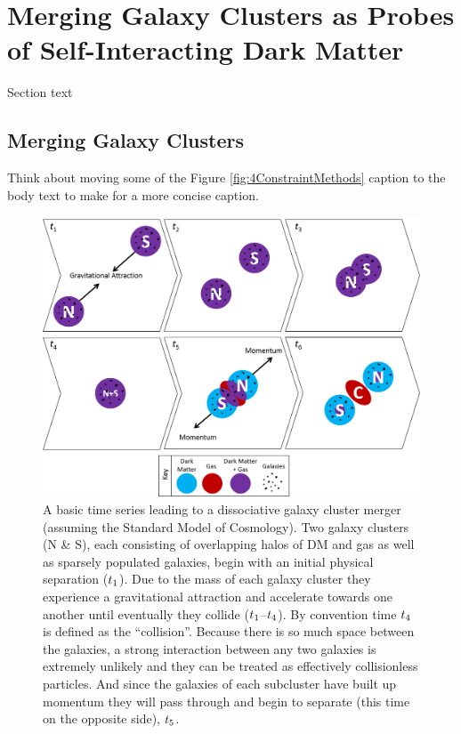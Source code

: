 \section{Merging Galaxy Clusters as Probes of Self-Interacting Dark Matter}

Section text

\subsection{Merging Galaxy Clusters}\label{Section:MergingClusters}

Think about moving some of the Figure \ref{fig:4ConstraintMethods} caption to the body text to make for a more concise caption.

\begin{figure}
\centering
\includegraphics[width=6in]{Chapter1/MergerTimeSeries.png}
\caption{A basic time series leading to a dissociative galaxy cluster merger (assuming the Standard Model of Cosmology).
Two galaxy clusters (N \& S), each consisting of overlapping halos of DM and gas as well as sparsely populated galaxies, begin with an initial physical separation ($t_{\rm 1}$).
Due to the mass of each galaxy cluster they experience a gravitational attraction and accelerate towards one another until eventually they collide ($t_{\rm 1}$--$t_{\rm 4}$).
By convention time $t_{\rm 4}$ is defined as the ``collision''.
Because there is so much space between the galaxies, a strong interaction between any two galaxies is extremely unlikely and they can be treated as effectively collisionless particles.
And since the galaxies of each subcluster have built up momentum they will pass through and begin to separate (this time on the opposite side), $t_{\rm 5}$.
}
\end{figure}
